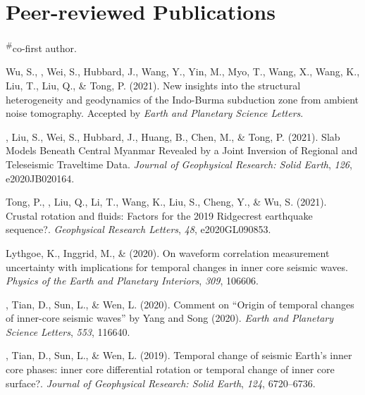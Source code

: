 \newcommand{\CS}{*} %
\newcommand{\CF}{\textsuperscript{\#}} %

\section*{Peer-reviewed Publications}
\CF co-first author.

\begin{etaremune}
\item
    Wu, S., \Yao, Wei, S., Hubbard, J., Wang, Y., Yin, M., Myo, T., Wang, X., Wang, K., Liu, T., Liu, Q., \& Tong, P. (2021).
    New insights into the structural heterogeneity and geodynamics of the Indo-Burma subduction zone from ambient noise tomography.
    Accepted by \textit{Earth and Planetary Science Letters}.
\item
    \Yao, Liu, S., Wei, S., Hubbard, J., Huang, B., Chen, M., \& Tong, P. (2021).
    Slab Models Beneath Central Myanmar Revealed by a Joint Inversion of Regional and Teleseismic Traveltime Data.
    \textit{Journal of Geophysical Research: Solid Earth}, \textit{126}, e2020JB020164.
\item
    Tong, P., \Yao, Liu, Q., Li, T., Wang, K., Liu, S., Cheng, Y., \& Wu, S. (2021).
    Crustal rotation and fluids: Factors for the 2019 Ridgecrest earthquake sequence?.
    \textit{Geophysical Research Letters}, \textit{48}, e2020GL090853.
\item
    Lythgoe, K., Inggrid, M., \& \Yao (2020).
    On waveform correlation measurement uncertainty with implications for temporal changes in inner core seismic waves.
    \textit{Physics of the Earth and Planetary Interiors}, \textit{309}, 106606.
\item
    \Yao, Tian, D., Sun, L., \& Wen, L. (2020).
    Comment on “Origin of temporal changes of inner-core seismic waves” by Yang and Song (2020).
    \textit{Earth and Planetary Science Letters}, \textit{553}, 116640.
\item
    \Yao, Tian, D., Sun, L., \& Wen, L. (2019).
    Temporal change of seismic Earth's inner core phases: inner core differential rotation or temporal change of inner core surface?.
    \textit{Journal of Geophysical Research: Solid Earth}, \textit{124}, 6720--6736.

\end{etaremune}
